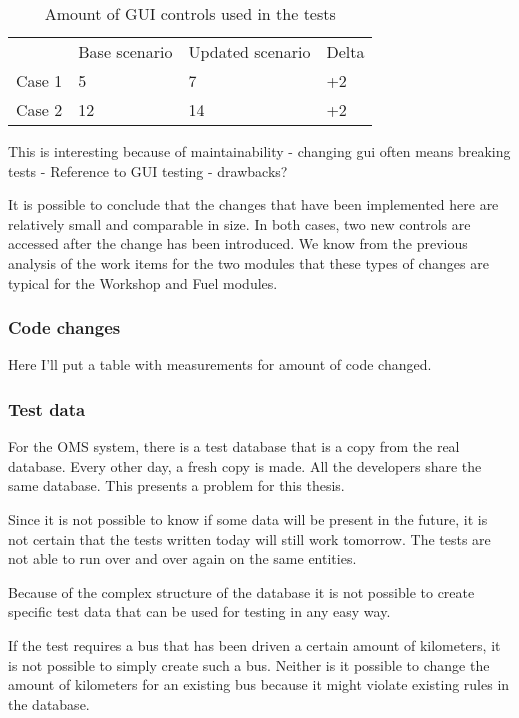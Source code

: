 \documentclass{article}
\begin{document}
			\begin{table}[h!]
				\begin{tabular}{l l l l}
				        & Base scenario & Updated scenario & Delta\\
				 Case 1 & 5      & 7     & +2 \\
				 Case 2 & 12     & 14    & +2 \\
				 \end{tabular}
				 \caption{Amount of GUI controls used in the tests}
			 \end{table}

			 This is interesting because of maintainability - changing gui often means breaking tests - Reference to GUI testing - drawbacks?

			 It is possible to conclude that the changes that have been implemented here are relatively small and comparable in size. In both cases, two new controls are accessed after the change has been introduced. We know from the previous analysis of the work items for the two modules that these types of changes are typical for the Workshop and Fuel modules.

			 \subsubsection{Code changes}

			 Here I'll put a table with measurements for amount of code changed.

			 \subsubsection{Test data}
			 For the OMS system, there is a test database that is a copy from the real database. Every other day, a fresh copy is made. All the developers share the same database. This presents a problem for this thesis. 

			 Since it is not possible to know if some data will be present in the future, it is not certain that the tests written today will still work tomorrow. The tests are not able to run over and over again on the same entities. 

			 Because of the complex structure of the database it is not possible to create specific test data that can be used for testing in any easy way.

			 If the test requires a bus that has been driven a certain amount of kilometers, it is not possible to simply create such a bus. Neither is it possible to change the amount of kilometers for an existing bus because it might violate existing rules in the database. 
\end{document}
